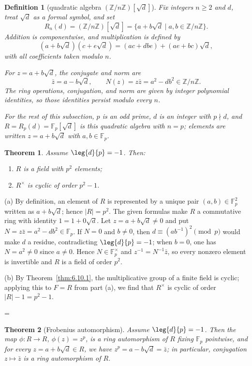 \documentclass[11pt]{article}
\makeatletter
\theoremstyle{ntstyle}
\newtheorem{theorem}{Theorem}[subsection]
\newtheorem{definition}{Definition}[subsection]
\let\nt@closedisplay\]
\def\nt@guardedclose{\@ifnextchar\par{\nt@closeafterpar}{\@ifnextchar\end{\postdisplaypenalty\@M\nt@closedisplay}{\nt@closedisplay}}}
\def\nt@closeafterpar\par{\@ifnextchar\par{\nt@closeafterpar}{\@ifnextchar\end{\postdisplaypenalty\@M\nt@closedisplay\par}{\nt@closedisplay\par}}}
\renewenvironment{proof}[1][\proofname]{\par
  \pushQED{\qed}\normalfont\topsep\medskipamount\edef\nt@afterproof{\@endparpenalty=\the\@endparpenalty\relax}\@beginparpenalty\@M\@endparpenalty\@M\let\]\nt@guardedclose\trivlist\item[]\textit{#1\@addpunct{.}} \ignorespaces}{\ifvmode\addpenalty\@M\fi\popQED\nt@afterproof\endtrivlist\@endpefalse}
\makeatother
\begin{document}
\begin{definition}[{quadratic algebra $(\mathbb{Z}/n\mathbb{Z})[\sqrt{d}]$}]\label{def:7.9.1}
	Fix integers $n\ge2$ and $d$, treat $\sqrt d$ as a formal symbol, and
	set
	\[
		R_n(d)=(\mathbb{Z}/n\mathbb{Z})[\sqrt d]
		=\{a+b\sqrt d\mid a,b\in\mathbb{Z}/n\mathbb{Z}\}.
	\]
	Addition is componentwise, and multiplication is defined by
	\[
		(a+b\sqrt d)(c+e\sqrt d)
		=(ac+dbe)+(ae+bc)\sqrt d,
	\]
	with all coefficients taken modulo $n$.

	For $z=a+b\sqrt d$, the conjugate and norm are
	\[
		\bar z=a-b\sqrt d,
		\qquad
		N(z)=z\bar z=a^2-db^2\in\mathbb{Z}/n\mathbb{Z}.
	\]
	The ring operations, conjugation, and norm are given by integer
	polynomial identities, so those identities persist modulo every $n$.


	For the rest of this subsection, $p$ is an odd prime,
	$d$ is an integer with $p\nmid d$, and
	$R=R_p(d)=\mathbb{F}_p[\sqrt d]$ is this quadratic algebra with
	$n=p$; elements are written $z=a+b\sqrt d$ with
	$a,b\in\mathbb{F}_p$.

\end{definition}

\begin{theorem}\label{thm:7.9.1} Assume $\leg{d}{p}=-1$. Then:
	\begin{enumerate}[label={\alph*)}]
		\item $R$ is a field with $p^{2}$ elements;
		\item $R^{\times}$ is cyclic of order $p^{2}-1$.
	\end{enumerate}

\end{theorem}

\begin{proof} (a) By definition, an element of $R$ is represented by a
	unique pair $(a,b)\in\mathbb{F}_p^2$ written as $a+b\sqrt{d}$; hence
	$|R|=p^2$. The given formulas make $R$ a commutative ring with
	identity $1 = 1 + 0\sqrt{d}$. Let $z = a + b\sqrt{d} \neq 0$ and put
	$N = z\bar z = a^2 - d b^2 \in \mathbb{F}_p$. If $N = 0$ and $b
		\neq 0$, then $d \equiv (a b^{-1})^2 \pmod{p}$ would make $d$ a residue,
	contradicting $\leg{d}{p} = -1$; when $b = 0$, one has $N =
		a^2 \neq 0$ since $a \neq 0$. Hence $N \in \mathbb{F}_p^{\times}$ and
	$z^{-1} = N^{-1}\bar z$, so every nonzero element is invertible and
	$R$ is a field of order $p^2$.

	(b) By Theorem~\ref{thm:6.10.1}, the multiplicative group of a finite field
	is cyclic; applying this to $F=R$ from part (a), we find that $R^{\times}$ is cyclic of
	order $|R|-1=p^{2}-1$.

\end{proof}
\begin{theorem}[Frobenius automorphism]\label{thm:7.9.2} Assume
	$\leg{d}{p}=-1$. Then the map $\phi:R\to R$, $\phi(z)=z^{p}$, is a ring
	automorphism of $R$ fixing $\mathbb{F}_p$ pointwise, and for every
	$z = a + b\sqrt{d} \in R$, we have $z^p = a - b\sqrt{d} = \bar z$; in particular,
	conjugation $z\mapsto\bar z$ is a ring automorphism of $R$.

\end{theorem}
\end{document}
